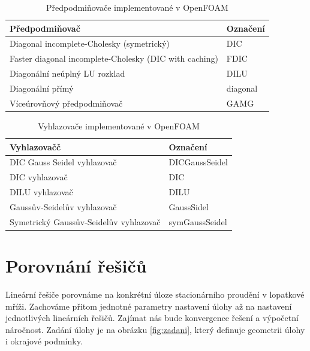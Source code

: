 \documentclass[a4paper,12pt]{report}
\theoremstyle{remark}
\begin{document}
\begin{table}[H]
	\centering
	\caption{Předpodmiňovače implementované v OpenFOAM}
	\renewcommand{\arraystretch}{1.7}
	\begin{tabular}{*2l}
		\toprule
		\textbf{Předpodmiňovač} & \textbf{Označení}\\
		\midrule
		{\small Diagonal incomplete-Cholesky (symetrický)}& DIC\\
		{\small Faster diagonal incomplete-Cholesky (DIC with caching)	}& FDIC \\		
		{\small Diagonální neúplný LU rozklad}& DILU  \\
		{\small Diagonální přímý}& diagonal \\
		{\small Víceúrovňový předpodmiňovač}& GAMG  \\
		\bottomrule
	\end{tabular}
	
	\label{table:preconditioners}
\end{table}

\begin{table}[H]
	\centering
	\caption{Vyhlazovače implementované v OpenFOAM}
	\renewcommand{\arraystretch}{1.7}
	\begin{tabular}{*2l}
		\toprule
		\textbf{Vyhlazovačč} & \textbf{Označení}\\
		\midrule
		{\small DIC Gauss Seidel vyhlazovač}& DICGaussSeidel\\
		{\small DIC vyhlazovač}& DIC\\		
		{\small DILU vyhlazovač}& DILU \\		
		{\small Gaussův-Seidelův vyhlazovač}& GaussSidel  \\
		{\small Symetrický Gaussův-Seidelův vyhlazovač}& symGaussSeidel \\
		\bottomrule
	\end{tabular}
	
	\label{table:smoothers}
\end{table}

	{\let\clearpage\relax \chapter{Porovnání řešičů}}
	
	Lineární řešiče porovnáme na konkrétní úloze stacionárního proudění v lopatkové mříži. Zachováme přitom jednotné parametry nastavení úlohy až na nastavení jednotlivých lineárních řešičů. Zajímat nás bude konvergence řešení a výpočetní náročnost. Zadání úlohy je na obrázku \ref{fig:zadani}, který definuje geometrii úlohy i okrajové podmínky. 
	
\end{document}
